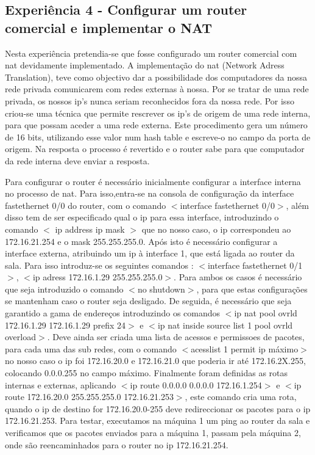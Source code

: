 \documentclass[a4paper]{article}
\begin{document}
\subsection{Experiência 4 - Configurar um router comercial e implementar o NAT}
Nesta experiência pretendia-se que fosse configurado um router comercial com nat devidamente implementado. A implementação do nat (Network Adress Translation), teve como objectivo dar a possibilidade dos computadores da nossa rede privada comunicarem com redes externas à nossa. Por se tratar de uma rede privada, os nossos ip’s nunca seriam reconhecidos fora da nossa rede. Por isso criou-se uma técnica que permite rescrever os ip’s de origem  de uma rede interna, para que possam aceder a uma rede externa. Este procedimento gera um número de 16 bits, utilizando esse valor num hash table e escreve-o no campo da porta de origem. Na resposta o processo é revertido e o router sabe para que computador da rede interna deve enviar a resposta.

Para configurar o router é necessário inicialmente configurar a interface interna no processo de nat. Para isso,entra-se na consola de configuração da interface fastethernet 0/0 do router, com o comando $<$interface fastethernet 0/0$>$, além disso tem de ser especificado qual o ip para essa interface, introduzindo o comando $<$ ip address ip mask $>$ que no nosso caso, o ip correspondeu ao 172.16.21.254 e o mask 255.255.255.0.  Após isto é necessário configurar a interface externa, atribuindo um ip à interface 1, que está ligada ao router da sala. Para isso introduz-se os seguintes comandos : $<$interface fastethernet 0/1$>$, $<$ip adress 172.16.1.29 255.255.255.0$>$. Para ambos os casos é necessário que seja introduzido o comando $<$no shutdown$>$, para que estas configurações se mantenham caso o router seja desligado. De seguida, é necessário que seja garantido a gama de endereços introduzindo os comandos $<$ip nat pool ovrld 172.16.1.29 172.16.1.29 prefix 24$>$ e $<$ip nat inside source list 1 pool ovrld overload$>$. Deve ainda ser criada uma lista de acessos e permissoes de pacotes, para cada uma das sub redes, com o comando $<$acesslist 1 permit ip máximo$>$ no nosso caso o ip foi 172.16.20.0 e 172.16.21.0 que poderia ir até 172.16.2X.255, colocando 0.0.0.255 no campo máximo.
Finalmente foram definidas as rotas internas e externas, aplicando $<$ip route 0.0.0.0
0.0.0.0 172.16.1.254$>$ e $<$ip route 172.16.20.0 255.255.255.0 172.16.21.253$>$, este comando cria uma rota, quando o ip de destino for 172.16.20.0-255 deve redireccionar os pacotes para o ip 172.16.21.253.
Para testar, executamos na máquina 1 um ping ao router da sala e verificamos que os pacotes enviados para a máquina 1, passam pela máquina 2, onde são reencaminhados para o router no ip 172.16.21.254.
\end{document}
